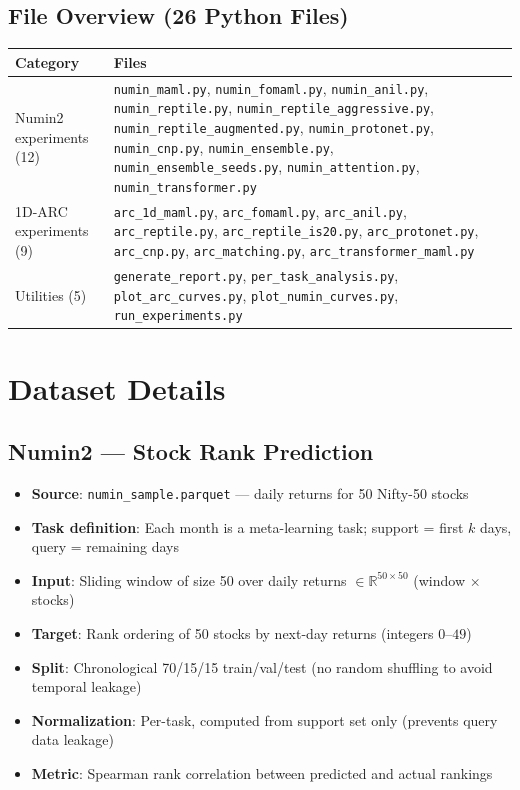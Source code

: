 \documentclass[11pt,a4paper]{article}
\begin{document}
\subsection{File Overview (26 Python Files)}
\begin{center}
\begin{tabular}{p{3.5cm}p{10cm}}
\toprule
\textbf{Category} & \textbf{Files} \\
\midrule
Numin2 experiments (12) & \texttt{numin\_maml.py}, \texttt{numin\_fomaml.py}, \texttt{numin\_anil.py}, \texttt{numin\_reptile.py}, \texttt{numin\_reptile\_aggressive.py}, \texttt{numin\_reptile\_augmented.py}, \texttt{numin\_protonet.py}, \texttt{numin\_cnp.py}, \texttt{numin\_ensemble.py}, \texttt{numin\_ensemble\_seeds.py}, \texttt{numin\_attention.py}, \texttt{numin\_transformer.py} \\
\midrule
1D-ARC experiments (9) & \texttt{arc\_1d\_maml.py}, \texttt{arc\_fomaml.py}, \texttt{arc\_anil.py}, \texttt{arc\_reptile.py}, \texttt{arc\_reptile\_is20.py}, \texttt{arc\_protonet.py}, \texttt{arc\_cnp.py}, \texttt{arc\_matching.py}, \texttt{arc\_transformer\_maml.py} \\
\midrule
Utilities (5) & \texttt{generate\_report.py}, \texttt{per\_task\_analysis.py}, \texttt{plot\_arc\_curves.py}, \texttt{plot\_numin\_curves.py}, \texttt{run\_experiments.py} \\
\bottomrule
\end{tabular}
\end{center}

\section{Dataset Details}

\subsection{Numin2 --- Stock Rank Prediction}
\begin{itemize}[nosep]
  \item \textbf{Source}: \texttt{numin\_sample.parquet} --- daily returns for 50 Nifty-50 stocks
  \item \textbf{Task definition}: Each month is a meta-learning task; support = first $k$ days, query = remaining days
  \item \textbf{Input}: Sliding window of size 50 over daily returns $\in \mathbb{R}^{50 \times 50}$ (window $\times$ stocks)
  \item \textbf{Target}: Rank ordering of 50 stocks by next-day returns (integers $0$--$49$)
  \item \textbf{Split}: Chronological 70/15/15 train/val/test (no random shuffling to avoid temporal leakage)
  \item \textbf{Normalization}: Per-task, computed from support set only (prevents query data leakage)
  \item \textbf{Metric}: Spearman rank correlation between predicted and actual rankings
\end{itemize}
\end{document}
